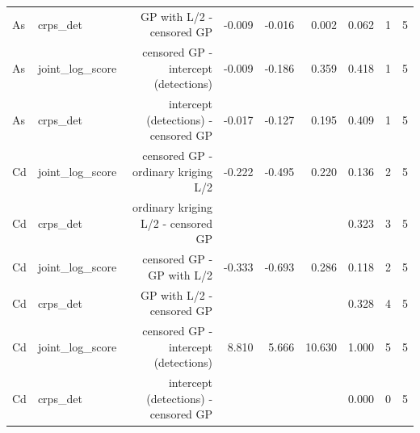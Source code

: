 \begin{table}[htbp]
\begin{tabular}{llrrrrrrr}
As & crps\_det & GP with L/2 - censored GP & -0.009 & -0.016 & 0.002 & 0.062 & 1 & 5 \\
As & joint\_log\_score & censored GP - intercept (detections) & -0.009 & -0.186 & 0.359 & 0.418 & 1 & 5 \\
As & crps\_det & intercept (detections) - censored GP & -0.017 & -0.127 & 0.195 & 0.409 & 1 & 5 \\
Cd & joint\_log\_score & censored GP - ordinary kriging L/2 & -0.222 & -0.495 & 0.220 & 0.136 & 2 & 5 \\
Cd & crps\_det & ordinary kriging L/2 - censored GP &  &  &  & 0.323 & 3 & 5 \\
Cd & joint\_log\_score & censored GP - GP with L/2 & -0.333 & -0.693 & 0.286 & 0.118 & 2 & 5 \\
Cd & crps\_det & GP with L/2 - censored GP &  &  &  & 0.328 & 4 & 5 \\
Cd & joint\_log\_score & censored GP - intercept (detections) & 8.810 & 5.666 & 10.630 & 1.000 & 5 & 5 \\
Cd & crps\_det & intercept (detections) - censored GP &  &  &  & 0.000 & 0 & 5 \\
\bottomrule
\end{tabular}
\end{table}
